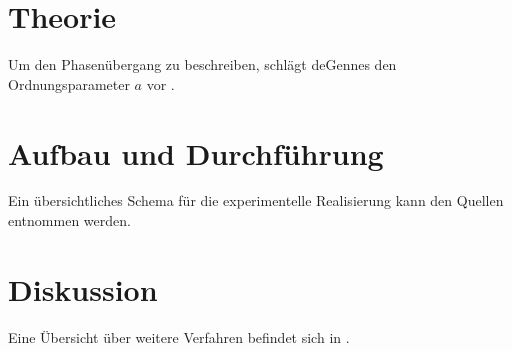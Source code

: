 \documentclass{scrartcl}
\begin{document}
  \section{Theorie}
    Um den Phasenübergang zu beschreiben, schlägt deGennes den Ordnungsparameter $a$ vor \cite[2-8]{deGennes}.
  \section{Aufbau und Durchführung}
    Ein übersichtliches Schema für die experimentelle Realisierung kann den Quellen \cite{martin, magnet} entnommen werden.
  \section{Diskussion}
    Eine Übersicht über weitere Verfahren befindet sich in \cite{kent}.
  \printbibliography
\end{document}
